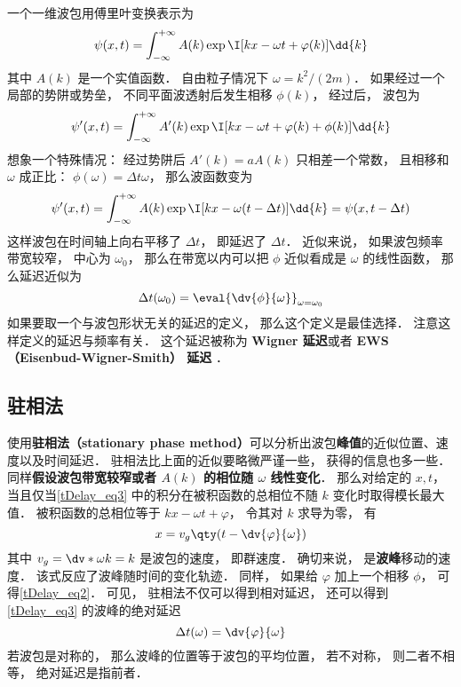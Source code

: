 
\begin{issues}
\issueDraft
\end{issues}

一个一维波包用傅里叶变换表示为
\begin{equation}\label{tDelay_eq3}
\psi(x, t) = \int_{-\infty}^{+\infty} A(k) \exp \I[ kx - \omega t + \varphi(k)] \dd{k}
\end{equation}
其中 $A(k)$ 是一个实值函数． 自由粒子情况下 $\omega = k^2/(2m)$． 如果经过一个局部的势阱或势垒， 不同平面波透射后发生相移 $\phi(k)$， 经过后， 波包为
\begin{equation}\label{tDelay_eq1}
\psi'(x, t) = \int_{-\infty}^{+\infty} A'(k) \exp \I[kx - \omega t + \varphi(k) + \phi(k)] \dd{k}
\end{equation}
想象一个特殊情况： 经过势阱后 $A'(k) = a A(k)$ 只相差一个常数， 且相移和 $\omega$ 成正比： $\phi(\omega) = \Delta t \omega$， 那么波函数变为
\begin{equation}
\psi'(x, t) = \int_{-\infty}^{+\infty} A(k) \exp \I[kx - \omega (t - \Delta t) ] \dd{k}
= \psi(x, t - \Delta t)
\end{equation}
这样波包在时间轴上向右平移了 $\Delta t$， 即延迟了 $\Delta t$． 近似来说， 如果波包频率带宽较窄， 中心为 $\omega_0$， 那么在带宽以内可以把 $\phi$ 近似看成是 $\omega$ 的线性函数， 那么延迟近似为
\begin{equation}\label{tDelay_eq2}
\Delta t(\omega_0) = \eval{\dv{\phi}{\omega}}_{\omega = \omega_0}
\end{equation}
如果要取一个与波包形状无关的延迟的定义， 那么这个定义是最佳选择． 注意这样定义的延迟与频率有关． 这个延迟被称为 \textbf{Wigner 延迟}或者 \textbf{EWS （Eisenbud-Wigner-Smith） 延迟} ．

\subsection{驻相法}
使用\textbf{驻相法（stationary phase method）}可以分析出波包\textbf{峰值}的近似位置、速度以及时间延迟． 驻相法比上面的近似要略微严谨一些， 获得的信息也多一些． 同样\textbf{假设波包带宽较窄或者 $A(k)$ 的相位随 $\omega$ 线性变化}． 那么对给定的 $x, t$， 当且仅当\autoref{tDelay_eq3} 中的积分在被积函数的总相位不随 $k$ 变化时取得模长最大值． 被积函数的总相位等于 $kx - \omega t + \varphi$， 令其对 $k$ 求导为零， 有
\begin{equation}\label{tDelay_eq5}
x = v_g \qty(t - \dv{\varphi}{\omega})
\end{equation}
其中 $v_g = \dv*{\omega}{k} = k$ 是波包的速度， 即群速度． 确切来说， 是\textbf{波峰}移动的速度． 该式反应了波峰随时间的变化轨迹． 同样， 如果给 $\varphi$ 加上一个相移 $\phi$， 可得\autoref{tDelay_eq2}． 可见， 驻相法不仅可以得到相对延迟， 还可以得到\autoref{tDelay_eq3} 的波峰的绝对延迟
\begin{equation}\label{tDelay_eq4}
\Delta t(\omega) = \dv{\varphi}{\omega}
\end{equation}
若波包是对称的， 那么波峰的位置等于波包的平均位置， 若不对称， 则二者不相等， 绝对延迟是指前者．

